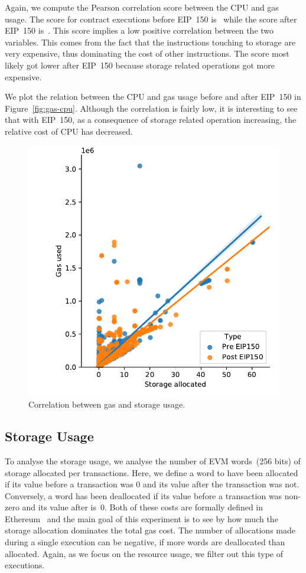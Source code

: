 Again, we compute the Pearson correlation score between the CPU and gas usage. The score for contract executions before EIP~150 is~ while the score after EIP~150 is~. This score implies a low positive correlation between the two variables. This comes from the fact that the instructions touching to storage are very expensive, thus dominating the cost of other instructions. The score most likely got lower after EIP~150 because storage related operations got more expensive.

We plot the relation between the CPU and gas usage before and after EIP~150 in Figure~\ref{fig:gas-cpu}. Although the correlation is fairly low, it is interesting to see that with EIP~150, as a consequence of storage related operation increasing, the relative cost of CPU has decreased.

\begin{figure}[tb] \centering\includegraphics[width=.8\columnwidth]{figures/storage-usage-1400000-1500000--2500000-2600000.pdf}
  \caption{Correlation between gas and storage usage.}
  \label{fig:gas-storage}
\end{figure}

\subsection{Storage Usage}
To analyse the storage usage, we analyse the number of EVM words~(256 bits) of storage allocated per transactions. Here, we define a word to have been allocated if its value before a transaction was 0 and its value after the transaction was not. Conversely, a word has been deallocated if its value before a transaction was non-zero and its value after is~0. Both of these costs are formally defined in Ethereum~\cite{wood2014ethereum} and the main goal of this experiment is to see by how much the storage allocation dominates the total gas cost. The number of allocations made during a single execution can be negative, if more words are deallocated than allocated. Again, as we focus on the resource usage, we filter out this type of executions.

